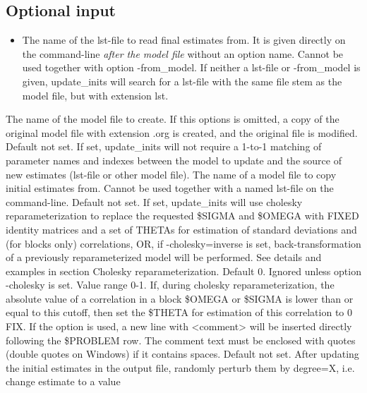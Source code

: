 \subsection{Optional input}
\begin{itemize}
\item The name of the lst-file to read final estimates from. It is given directly on 
the command-line \emph{after the model file} without an option name.
Cannot be used together with option -from\_model. 
If neither a lst-file or -from\_model is given, 
update\_inits will search for a lst-file with the same file stem as the model file, 
but with extension lst.
\end{itemize}
\begin{optionlist}
The name of the model file to create. If this options is omitted, a copy of
the original model file with extension .org is created, and 
the original file is modified.
\nextopt
{}
Default not set. If set, update\_inits will not require 
a 1-to-1 matching of parameter names and indexes between the model to update and the source
of new estimates (lst-file or other model file).
\nextopt
{}
The name of a model file to copy initial estimates from. 
Cannot be used together with a named lst-file on the command-line.
\nextopt
{}
Default not set.
If set, update\_inits will use cholesky reparameterization to replace the requested
\$SIGMA and \$OMEGA with FIXED identity matrices and a set of THETAs for estimation
of standard deviations and (for blocks only) correlations, OR, if -cholesky=inverse is set,
back-transformation of a previously reparameterized model will be performed. See details and
examples in section Cholesky reparameterization.
\nextopt
{}
Default 0. Ignored unless option -cholesky is set. Value range 0-1.
If, during cholesky reparameterization, the absolute value of a correlation 
in a block \$OMEGA or \$SIGMA is lower than or equal to this cutoff, then set
the \$THETA for estimation of this correlation to 0 FIX.
\nextopt
{}
If the option is used, a new line with <comment> will be inserted 
directly following the \$PROBLEM row.
The comment text must be enclosed with quotes (double quotes on Windows) 
if it contains spaces.
\nextopt
{}
Default not set. 
After updating the initial estimates in the output file, randomly
perturb them by degree=X, i.e. change estimate to a value

\end{optionlist}
